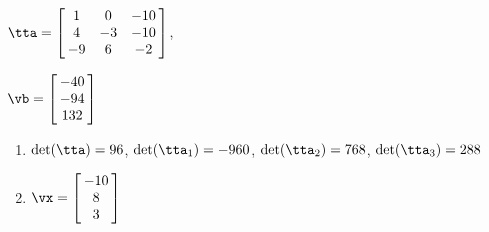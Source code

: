 {$\tta = \left[\hskip -3pt \begin{array}{ccc} 1&0&-10\\  4&-3&-10
\\  -9&6&-2\end{array}\hskip -3pt \right] $,

$\vb = \left[\hskip -3pt \begin{array}{c} -40\\  -94
\\  132\end{array}\hskip -3pt \right]$}
{\begin{enumerate}
\item	$\det(\tta) = 96$, $\det(\tta_1) = -960$, $\det(\tta_2) = 768$, $\det(\tta_3) = 288$
\item $\vx = \left[\hskip -3pt \begin{array}{c} -10\\  8\\  
3\end{array}\hskip -3pt \right]$
\end{enumerate}
}

 

 

